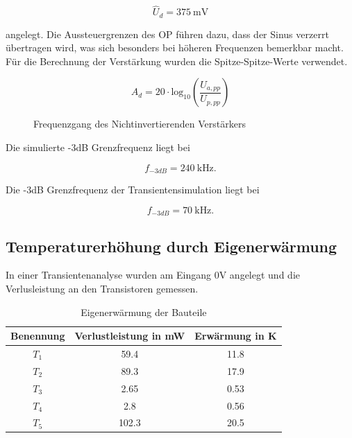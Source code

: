\begin{equation*}
    \hat{U}_d = \SI{375}{\milli\volt}
\end{equation*}

angelegt. Die Aussteuergrenzen des OP führen dazu, dass der Sinus verzerrt übertragen wird, was sich besonders bei höheren Frequenzen bemerkbar macht. Für die Berechnung der Verstärkung wurden die Spitze-Spitze-Werte verwendet.

\begin{equation}
    A_d = 20 \cdot \text{log}_{10} \left( \frac{U_{a,pp}}{U_{p,pp}} \right)
\end{equation}

\begin{figure}[H]
	\centering \small
	\scalebox{0.9}{}
	\caption{Frequenzgang des Nichtinvertierenden Verstärkers}
	\label{fig_Kap5_23:Mag}
\end{figure}

Die simulierte -3dB Grenzfrequenz liegt bei

\begin{equation*}
    f_{-3dB} = \SI{240}{\kilo\hertz} .
\end{equation*}

Die -3dB Grenzfrequenz der Transientensimulation liegt bei

\begin{equation*}
    f_{-3dB} = \SI{70}{\kilo\hertz} .
\end{equation*}

\subsection{Temperaturerhöhung durch Eigenerwärmung}
In einer Transientenanalyse wurden am Eingang 0V angelegt und die Verlusleistung an den Transistoren gemessen.

\begin{table}[H]
\centering
\begin{tabular}{|c|c|c|} \hline
Benennung & Verlustleistung in mW & Erwärmung in K \\ \hline
$T_1$ & 59.4 & 11.8 \\ \hline
$T_2$  & 89.3 & 17.9 \\ \hline
$T_3$  & 2.65 & 0.53 \\ \hline
$T_4$  & 2.8 & 0.56 \\ \hline
$T_5$  & 102.3 & 20.5 \\ \hline
\end{tabular}
\caption{Eigenerwärmung der Bauteile}
\label{tab} 
\end{table}



